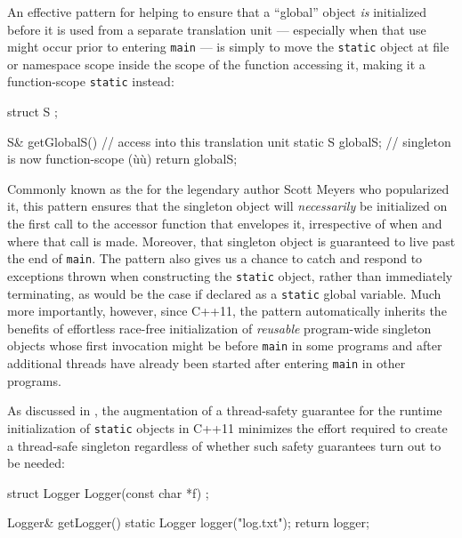 An effective pattern for helping to ensure that a ``global'' object
\emph{is} initialized before it is used from a separate translation unit
--- especially when that use might occur prior to entering \lstinline!main!
--- is simply to move the \lstinline!static! object at file or namespace
scope inside the scope of the function accessing it, making it a
function-scope \lstinline!static! instead:

\begin{emcppshiddenlisting}[emcppsbatch=e8]
struct S {
};
\end{emcppshiddenlisting}
\begin{emcppslisting}[emcppsbatch=e8]
S& getGlobalS()  // access into this translation unit
{
    static S globalS;  // singleton is now function-scope (ù{}ù)
    return globalS;
}
\end{emcppslisting}

\noindent Commonly known as the  for the
legendary author Scott Meyers who popularized it, this pattern ensures that the
singleton object will \emph{necessarily} be initialized on the first
call to the accessor function that envelopes it, irrespective of when
and where that call is made. Moreover, that singleton object is
guaranteed to live past the end of \lstinline!main!. The  pattern also gives us a chance to catch and respond to
exceptions thrown when constructing the \lstinline!static! object, rather
than immediately terminating, as would be the case if declared as a
\lstinline!static! global variable. Much more importantly, however, since C++11, the
 pattern automatically inherits the benefits of
effortless race-free initialization of \emph{reusable} program-wide
singleton objects whose first invocation might be before \lstinline!main!
in some programs and after additional threads have already been started
after entering \lstinline!main! in other programs.

As discussed in , the augmentation of a
thread-safety guarantee for the runtime initialization of
 \lstinline!static! objects in C++11 minimizes the
effort required to create a thread-safe singleton regardless of whether
such safety guarantees turn out to be needed:

\begin{emcppshiddenlisting}[emcppsbatch=e9]
struct Logger {
  Logger(const char *f) {}
};
\end{emcppshiddenlisting}
\begin{emcppslisting}[emcppsbatch=e9]
Logger& getLogger()
{
    static Logger logger("log.txt");
    return logger;
}
\end{emcppslisting}

